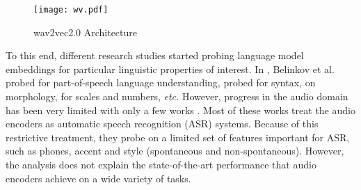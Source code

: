 \documentclass[sigconf]{acmart}
\begin{document}
\begin{figure*}

  \texttt{[image: wv.pdf]}
  \caption{\label{fig:wv arch}wav2vec2.0  Architecture}
\end{figure*}

To this end, different research studies started probing language model embeddings for particular linguistic properties of interest. In \cite{belinkov2017neural}, Belinkov et al. probed for part-of-speech language understanding, \cite{hewitt2019structural} probed for syntax, \cite{peters2018deep} on morphology, \cite{zhang2020language} for scales and numbers, \emph{etc.} However, progress in the audio domain has been very limited with only a few works \cite{raj2019probing,alishahi2017encoding,belinkov2017analyzing,prasad2020accents}. Most of these works treat the audio encoders as automatic speech recognition (ASR) systems. Because of this restrictive treatment, they probe on a limited set of features important for ASR, such as phones, accent and style (spontaneous and non-spontaneous). However, the analysis does not explain the state-of-the-art performance that audio encoders achieve on a wide variety of tasks.





\end{document}
